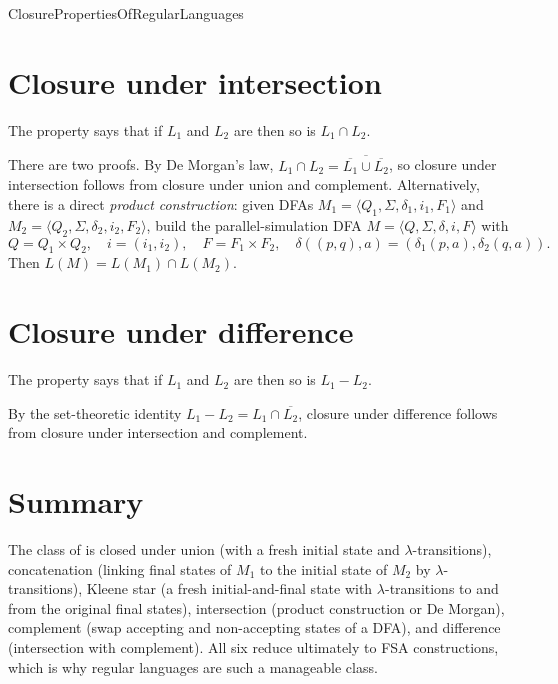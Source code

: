 \documentclass[hidelinks]{article}
\begin{document}
\begin{smodule}[title={Closure Properties of Regular Languages}]{ClosurePropertiesOfRegularLanguages}
\section{Closure under intersection}

\begin{sdefinition}[for=closure under intersection]
The  property says that if $L_1$ and $L_2$ are  then so is $L_1 \cap L_2$.
\end{sdefinition}

There are two proofs. By De Morgan's law, $L_1 \cap L_2 = \overline{\overline{L_1} \cup \overline{L_2}}$, so closure under intersection follows from closure under union and complement. Alternatively, there is a direct \emph{product construction}: given DFAs $M_1 = \langle Q_1, \Sigma, \delta_1, i_1, F_1 \rangle$ and $M_2 = \langle Q_2, \Sigma, \delta_2, i_2, F_2 \rangle$, build the parallel-simulation DFA $M = \langle Q, \Sigma, \delta, i, F \rangle$ with
\[
Q = Q_1 \times Q_2,\quad i = (i_1, i_2),\quad F = F_1 \times F_2,\quad \delta((p, q), a) = (\delta_1(p, a), \delta_2(q, a)).
\]
Then $L(M) = L(M_1) \cap L(M_2)$.

\section{Closure under difference}

\begin{sdefinition}[for=closure under difference]
The  property says that if $L_1$ and $L_2$ are  then so is $L_1 - L_2$.
\end{sdefinition}

By the set-theoretic identity $L_1 - L_2 = L_1 \cap \overline{L_2}$, closure under difference follows from closure under intersection and complement.

\section{Summary}

The class of  is closed under union (with a fresh initial state and $\lambda$-transitions), concatenation (linking final states of $M_1$ to the initial state of $M_2$ by $\lambda$-transitions), Kleene star (a fresh initial-and-final state with $\lambda$-transitions to and from the original final states), intersection (product construction or De Morgan), complement (swap accepting and non-accepting states of a DFA), and difference (intersection with complement). All six  reduce ultimately to FSA constructions, which is why regular languages are such a manageable class.

\end{smodule}
\end{document}
